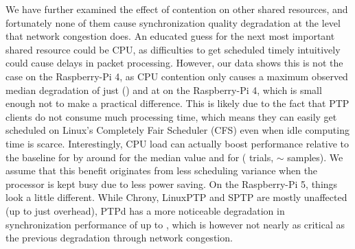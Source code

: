 We have  further examined the effect of contention on other shared resources, and fortunately none of them cause synchronization quality degradation at the level that network congestion does.
An educated guess for the next most important shared resource could be CPU, as difficulties to get scheduled timely intuitively could cause delays in packet processing.
However, our data shows this is not the case on the Raspberry-Pi 4, as CPU contention only causes a maximum observed median degradation of just \fRelative{\cmpMax} (\fVendor{\cmpMaxArg}) and \fRelative{\cmpMax} at \PNineFive{} on the Raspberry-Pi 4, which is small enough not to make a practical difference.
This is likely due to the fact that PTP clients do not consume much processing time, which means they can easily get scheduled on Linux's Completely Fair Scheduler (CFS) even when idle computing time is scarce.
Interestingly, CPU load can actually boost performance relative to the baseline for \fVendor{\cmpMinArg} by around \fRelativeInverted{\cmpMin} for the median value and \fRelativeInverted{\cmpMin} for \PNineFive{} ( trials, $\sim$ samples).
%
%
We assume that this benefit originates from less scheduling variance when the processor is kept busy due to less power saving.
%
%
On the Raspberry-Pi 5, things look a little different. While Chrony, LinuxPTP and SPTP are mostly unaffected (up to just \fRelative{\cmpMax} overhead),
%
%
PTPd has a more noticeable degradation in synchronization performance of up to \fRelative{\cmpMax}, which is however not nearly as critical as the previous degradation through network congestion.

%


